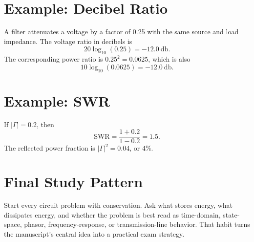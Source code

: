 \section{Example: Decibel Ratio}
A filter attenuates a voltage by a factor of 0.25 with the same source and load
impedance. The voltage ratio in decibels is
\[
20\log_{10}(0.25)= -\SI{12.0}{\decibel}.
\]
The corresponding power ratio is \(0.25^2=0.0625\), which is also
\[
10\log_{10}(0.0625)= -\SI{12.0}{\decibel}.
\]

\section{Example: SWR}
If \(|\Gamma|=0.2\), then
\[
\mathrm{SWR}=\frac{1+0.2}{1-0.2}=1.5.
\]
The reflected power fraction is \(|\Gamma|^2=0.04\), or \(4\%\).

\section{Final Study Pattern}
Start every circuit problem with conservation. Ask what stores energy, what
dissipates energy, and whether the problem is best read as time-domain,
state-space, phasor, frequency-response, or transmission-line behavior. That
habit turns the manuscript's central idea into a practical exam strategy.
